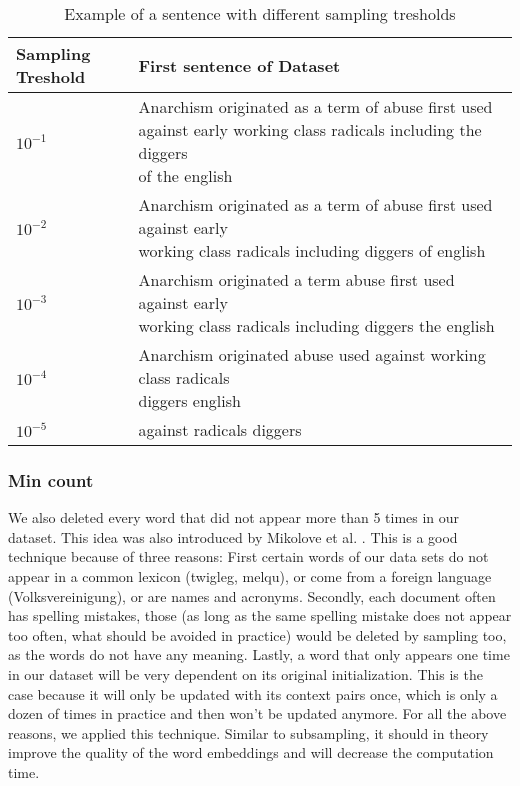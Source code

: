 \begin{table*}[tb]\centering
\caption{Example of a sentence with different sampling tresholds}
    \begin{tabular}{l l}%
        \toprule
Sampling Treshold & First sentence of Dataset \\ 
        \midrule%
$10^{-1}$ & \makecell[l]{Anarchism originated as a term of abuse first used against early working class radicals including the diggers\\ of the english} \\ \hline
$10^{-2}$  & \makecell[l]{ Anarchism originated as a term of abuse first used against early \\ working class radicals including diggers of english} \\ \hline
$10^{-3}$ & \makecell[l]{Anarchism originated a term abuse first used against early \\ working class radicals including diggers the english}\\ \hline
$10^{-4}$ &\makecell[l]{ Anarchism originated abuse used against working class radicals\\ diggers english} \\ \hline
$10^{-5}$ & against radicals diggers \\ \hline        
        \midrule%
   \end{tabular}%
\label{table:treshold_examples}
\end{table*}



\subsubsection{Min count}
We also deleted every word that did not appear more than 5 times in our dataset. This idea was also introduced by Mikolove et al. \cite{mikolov2}. This is a good technique because of three reasons: First certain words of our data sets do not appear in a common lexicon (twigleg, melqu), or come from a foreign language (Volksvereinigung), or are names and acronyms. Secondly, each document often has spelling mistakes, those (as long as the same spelling mistake does not appear too often, what should be avoided in practice) would be deleted by sampling too, as the words do not have any meaning. Lastly, a word that only appears one time in our dataset will be very dependent on its original initialization. This is the case because it will only be updated with its context pairs once, which is only a dozen of times in practice and then won't be updated anymore. For all the above reasons, we applied this technique. Similar to subsampling, it should in theory improve the quality of the word embeddings and will decrease the computation time.

